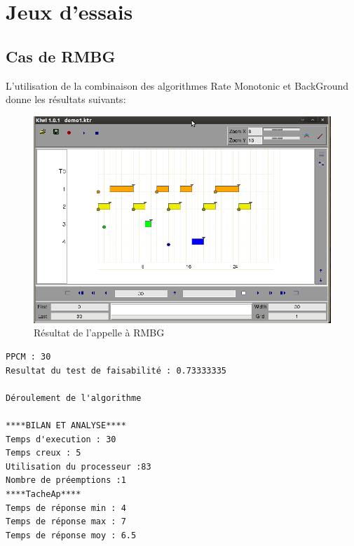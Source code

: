 \chapter{Jeux d'essais}
\section{Cas de RMBG}
L'utilisation de la combinaison des algorithmes Rate Monotonic et BackGround donne les résultats suivants:
\begin{figure}[htbp]
  \centering
  \includegraphics[scale=0.60]{img/RMBG}
  \caption{Résultat de l'appelle à RMBG}
  \label{fig:RMBG}
\end{figure}

\begin{verbatim}
PPCM : 30
Resultat du test de faisabilité : 0.73333335

Déroulement de l'algorithme

****BILAN ET ANALYSE****
Temps d'execution : 30
Temps creux : 5
Utilisation du processeur :83
Nombre de préemptions :1
****TacheAp****
Temps de réponse min : 4
Temps de réponse max : 7
Temps de réponse moy : 6.5
\end{verbatim}

